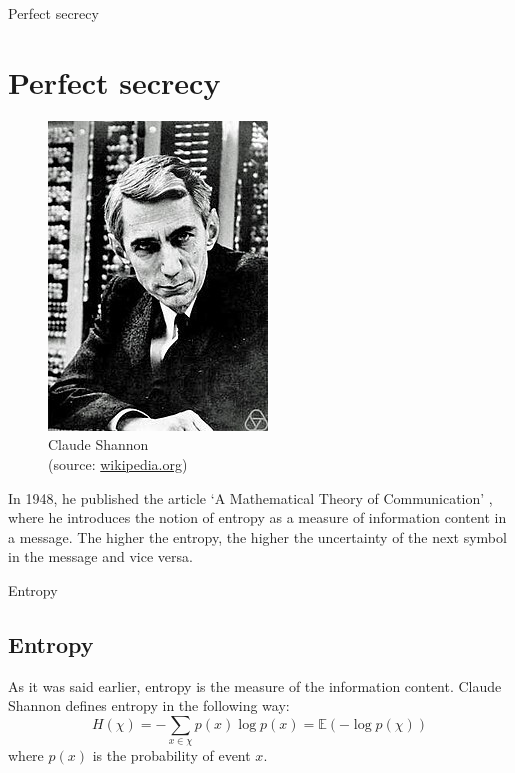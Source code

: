 \documentclass{beamer}
\begin{document}
\begin{frame}{Perfect secrecy}
	\section{Perfect secrecy}
    \begin{figure}
        \begin{center}
        \includegraphics[height=0.35\textheight]{shannon.jpg}
        \end{center}
    \caption{Claude Shannon \\ (source: \href{https://wikipedia.org}{wikipedia.org})}
    \end{figure}
    In 1948, he published the article `A Mathematical Theory of Communication' \cite{shannon-1948}, where he introduces the notion of entropy as a measure
    of information content in a message. The higher the entropy, the higher the uncertainty of the next symbol in the message and vice
    versa.
\end{frame}

\begin{frame}{Entropy}
    \subsection{Entropy}
    As it was said earlier, entropy is the measure of the information content. Claude Shannon defines entropy in the following way:
    \begin{equation}
        H(\chi) = -\sum_{x \in \chi}{p(x) \log p(x) = \mathbb{E}(- \log p(\chi))}
    \end{equation}
    where $p(x)$ is the probability of event $x$.
\end{frame}
\end{document}
